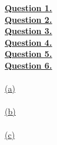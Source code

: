 \documentclass[12pt]{article}
\begin{document}
\hyperlink{toc}{\hypertarget{1}{\LARGE \underline{\textbf{Question 1.}}}}\\
\newpage
\hyperlink{toc}{\hypertarget{2}{\LARGE \underline{\textbf{Question 2.}}}}\\
\newpage
\hyperlink{toc}{\hypertarget{3}{\LARGE \underline{\textbf{Question 3.}}}}\\
\newpage
\hyperlink{toc}{\hypertarget{4}{\LARGE \underline{\textbf{Question 4.}}}}\\
\newpage
\hyperlink{toc}{\hypertarget{5}{\LARGE \underline{\textbf{Question 5.}}}}\\
\newpage
\hyperlink{toc}{\LARGE \underline{\textbf{Question 6.}}}\\
~\\\hyperlink{toc}{\hypertarget{6.1}{(a)}}\\
~\\\hyperlink{toc}{\hypertarget{6.2}{(b)}}\\
~\\\hyperlink{toc}{\hypertarget{6.3}{(c)}}\\
\newpage
\end{document}
